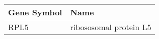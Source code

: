 \begin{tabular}{ll}
\toprule
Gene Symbol &                   Name \\
\midrule
       RPL5 & ribososomal protein L5 \\
\bottomrule
\end{tabular}
